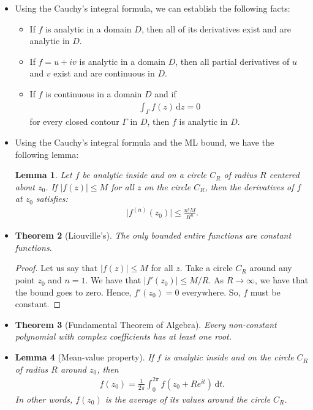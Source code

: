 \documentclass[10pt]{article}
\newtheorem{lemma}{Lemma}[section]
\newtheorem{theorem}[lemma]{Theorem}
\newcommand{\dee}{\mathrm{d}}
\newcommand{\ra}{\rightarrow}
\begin{document}
\begin{itemize}
    \item Using the Cauchy's integral formula, we can establish the following facts:
    \begin{itemize}
      \item  If $f$ is analytic in a domain $D$, then all of its derivatives exist and are analytic in $D$.
      \item If $f = u+iv$ is analytic in a domain $D$, then all partial derivatives of $u$ and $v$ exist and are continuous in $D$.
      \item If $f$ is continuous in a domain $D$ and if
      \begin{align*}
        \int_\Gamma f(z)\, \dee z = 0        
      \end{align*}
      for every closed contour $\Gamma$ in $D$, then $f$ is analytic in $D$.
    \end{itemize}

    \item Using the Cauchy's integral formula and the ML bound, we have the following lemma:
    \begin{lemma}
      Let $f$ be analytic inside and on a circle $C_R$ of radius $R$ centered about $z_0$. If $|f(z)| \leq M$ for all $z$ on the circle $C_R$, then the derivatives of $f$ at $z_0$ satisfies:
      \begin{align*}
        \Big| f^{(n)}(z_0) \Big| \leq \frac{n!M}{R^n}.
      \end{align*}
    \end{lemma}

    \item \begin{theorem}[Liouville's]
      The only bounded entire functions are constant functions.
    \end{theorem}
    \begin{proof}
      Let us say that $|f(z)| \leq M$ for all $z$. Take a circle $C_R$ around any point $z_0$ and $n = 1$. We have that $|f'(z_0)| \leq M/R$. As $R \ra \infty$, we have that the bound goes to zero. Hence, $f'(z_0) = 0$ everywhere. So, $f$ must be constant.
    \end{proof}

    \item \begin{theorem}[Fundamental Theorem of Algebra]
      Every non-constant polynomial with complex coefficients has at least one root.
    \end{theorem}

    \item \begin{lemma}[Mean-value property]
      If $f$ is analytic inside and on the circle $C_R$ of radius $R$ around $z_0$, then
      \begin{align*}
        f(z_0) = \frac{1}{2\pi} \int_0^{2\pi} f(z_0 + Re^{it})\, \dee t.
      \end{align*}
      In other words, $f(z_0)$ is the average of its values around the circle $C_R$.
      \end{lemma}


\end{itemize}
\end{document}
